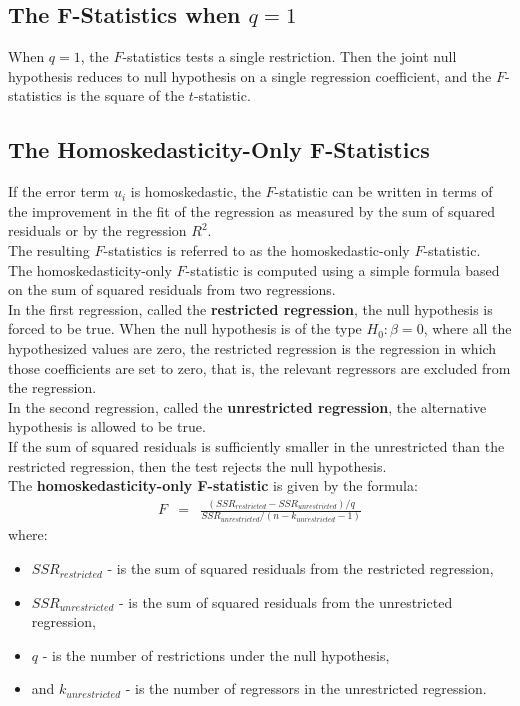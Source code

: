 \subsection{The F-Statistics when \texorpdfstring{$q = 1$}{q1}}
When $q = 1$, the $F$-statistics tests a single restriction. Then the joint null hypothesis reduces to null hypothesis on a single regression coefficient, and the $F$-statistics is the square of the $t$-statistic.

\subsection{The Homoskedasticity-Only F-Statistics}
If the error term $u_{i}$ is homoskedastic,  the $F$-statistic can be written in terms of the improvement in the fit of the regression as measured by the sum of squared residuals or by the regression $R^{2}$.\\
The resulting $F$-statistics is referred to as the homoskedastic-only $F$-statistic.\\
The homoskedasticity-only $F$-statistic is computed using a simple formula based on the sum of squared residuals from two regressions.\\
In the first regression, called the \textbf{restricted regression}, the null hypothesis is forced to be true. When the null hypothesis is of the type $H_{0}: \beta = 0$, where all the hypothesized values are zero, the restricted regression is the regression in which those coefficients are set to zero, that is, the relevant regressors are excluded from the regression.\\
In the second regression, called the \textbf{unrestricted regression}, the alternative hypothesis is allowed to be true.\\
If the sum of squared residuals is sufficiently smaller in the unrestricted than the restricted regression, then the test rejects the null hypothesis.\\
The \textbf{homoskedasticity-only F-statistic} is given by the formula:
\begin{eqnarray}
\label{Eq:HomoskedasticFStatistic}
F &=& \frac{\left(SSR_{restricted} - SSR_{unrestricted}\right) / q}{SSR_{unrestricted} / \left(n - k_{unrestricted} - 1\right)}
\end{eqnarray}
where:
\begin{itemize}
	\item $SSR_{restricted}$ - is the sum of squared residuals from the restricted regression,
	\item $SSR_{unrestricted}$ - is the sum of squared residuals from the unrestricted regression,
	\item $q$ - is the number of restrictions under the null hypothesis,
	\item and $k_{unrestricted}$ - is the number of regressors in the unrestricted regression.
\end{itemize}
